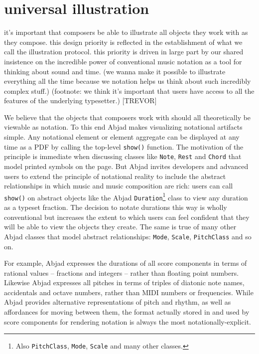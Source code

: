 \documentclass{article}
\begin{document}
\section{universal illustration}

it's important that composers be able to
illustrate all objects they work with as they compose. this design priority is
reflected in the establishment of what we call the illustration protocol. this
priority is driven in large part by our shared insistence on the incredible
power of conventional music notation as a tool for thinking about sound and
time. (we wanna make it possible to illustrate everything all the time because
we notation helps us think about such incredibly complex stuff.) (footnote: we
think it's important that users have access to all the features of the
underlying typesetter.) [TREVOR]

\hrulefill\vspace{5pt}

We believe that the objects that composers work with should all theoretically
be viewable as notation. To this end Abjad makes visualizing notational
artifacts simple. Any notational element or element aggregate can be displayed
at any time as a PDF by calling the top-level \texttt{show()} function. The
motivation of the principle is immediate when discussing classes like
\texttt{Note}, \texttt{Rest} and \texttt{Chord} that model printed symbols on
the page. But Abjad invites developers and advanced users to extend the
principle of notational reality to include the abstract relationships in which
music and music composition are rich: users can call \texttt{show()} on
abstract objects like the Abjad \texttt{Duration}\footnote{Also
\texttt{PitchClass}, \texttt{Mode}, \texttt{Scale} and many other classes.}
class to view any duration as a typeset fraction. The decision to notate
durations this way is wholly conventional but increases the extent to which
users can feel confident that they will be able to view the objects they
create. The same is true of many other Abjad classes that model abstract
relationships: \texttt{Mode}, \texttt{Scale}, \texttt{PitchClass} and so on.

For example, Abjad expresses the durations of all score components in terms of
rational values -- fractions and integers -- rather than floating point
numbers. Likewise Abjad expresses all pitches in terms of triples of diatonic
note names, accidentals and octave numbers, rather than MIDI numbers or
frequencies. While Abjad provides alternative representations of pitch and
rhythm, as well as affordances for moving between them, the format actually
stored in and used by score components for rendering notation is always the
most notationally-explicit.
\end{document}
